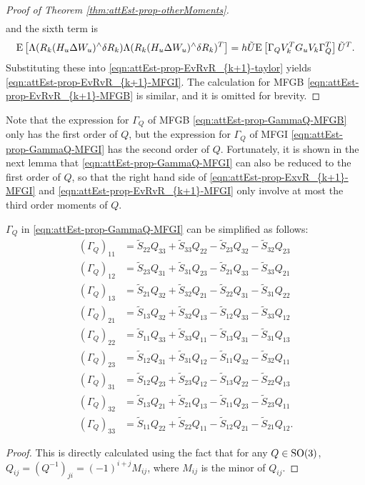 \begin{proof}[Proof of Theorem \ref{thm:attEst-prop-otherMoments}]
\begin{align*}
	\end{align*}
	and the sixth term is
	\begin{align*}
		\mathrm{E}\left[ \Lambda( R_k(H_u\Delta W_u)^\wedge\delta R_k ) \Lambda( R_k(H_u\Delta W_u)^\wedge\delta R_k )^T \right] = h\tilde{U} \mathrm{E}\left[ \Gamma_Q V_k^T G_u V_k \Gamma_Q^T \right] \tilde{U}^T.
	\end{align*}
	Substituting these into \eqref{eqn:attEst-prop-EvRvR_{k+1}-taylor} yields \eqref{eqn:attEst-prop-EvRvR_{k+1}-MFGI}.
	The calculation for MFGB \eqref{eqn:attEst-prop-EvRvR_{k+1}-MFGB} is similar, and it is omitted for brevity.
\end{proof}

Note that the expression for $\Gamma_Q$ of MFGB \eqref{eqn:attEst-prop-GammaQ-MFGB} only has the first order of $Q$, but the expression for $\Gamma_Q$ of MFGI \eqref{eqn:attEst-prop-GammaQ-MFGI} has the second order of $Q$.
Fortunately, it is shown in the next lemma that \eqref{eqn:attEst-prop-GammaQ-MFGI} can also be reduced to the first order of $Q$, so that the right hand side of \eqref{eqn:attEst-prop-ExvR_{k+1}-MFGI} and \eqref{eqn:attEst-prop-EvRvR_{k+1}-MFGI} only involve at most the third order moments of $Q$.

\begin{lemma} \label{lemma:attEst-GammaQ}
	$\Gamma_Q$ in \eqref{eqn:attEst-prop-GammaQ-MFGI} can be simplified as follows:
	\begin{align}
		(\Gamma_Q)_{11} &= \tilde{S}_{22}Q_{33} + \tilde{S}_{33}Q_{22} - \tilde{S}_{23}Q_{32} - \tilde{S}_{32}Q_{23} \nonumber \\
		(\Gamma_Q)_{12} &= \tilde{S}_{23}Q_{31} + \tilde{S}_{31}Q_{23} - \tilde{S}_{21}Q_{33} - \tilde{S}_{33}Q_{21} \nonumber \\
		(\Gamma_Q)_{13} &= \tilde{S}_{21}Q_{32} + \tilde{S}_{32}Q_{21} - \tilde{S}_{22}Q_{31} - \tilde{S}_{31}Q_{22} \nonumber \\
		(\Gamma_Q)_{21} &= \tilde{S}_{13}Q_{32} + \tilde{S}_{32}Q_{13} - \tilde{S}_{12}Q_{33} - \tilde{S}_{33}Q_{12} \nonumber \\
		(\Gamma_Q)_{22} &= \tilde{S}_{11}Q_{33} + \tilde{S}_{33}Q_{11} - \tilde{S}_{13}Q_{31} - \tilde{S}_{31}Q_{13} \nonumber \\
		(\Gamma_Q)_{23} &= \tilde{S}_{12}Q_{31} + \tilde{S}_{31}Q_{12} - \tilde{S}_{11}Q_{32} - \tilde{S}_{32}Q_{11} \nonumber \\
		(\Gamma_Q)_{31} &= \tilde{S}_{12}Q_{23} + \tilde{S}_{23}Q_{12} - \tilde{S}_{13}Q_{22} - \tilde{S}_{22}Q_{13} \nonumber \\
		(\Gamma_Q)_{32} &= \tilde{S}_{13}Q_{21} + \tilde{S}_{21}Q_{13} - \tilde{S}_{11}Q_{23} - \tilde{S}_{23}Q_{11} \nonumber \\
		(\Gamma_Q)_{33} &= \tilde{S}_{11}Q_{22} + \tilde{S}_{22}Q_{11} - \tilde{S}_{12}Q_{21} - \tilde{S}_{21}Q_{12}.
	\end{align}
\end{lemma}
\begin{proof}
	This is directly calculated using the fact that for any $Q\in\mathrm{SO}(3)$, $Q_{ij} = (Q^{-1})_{ji} =(-1)^{i+j}M_{ij}$, where $M_{ij}$ is the minor of $Q_{ij}$.
\end{proof}

